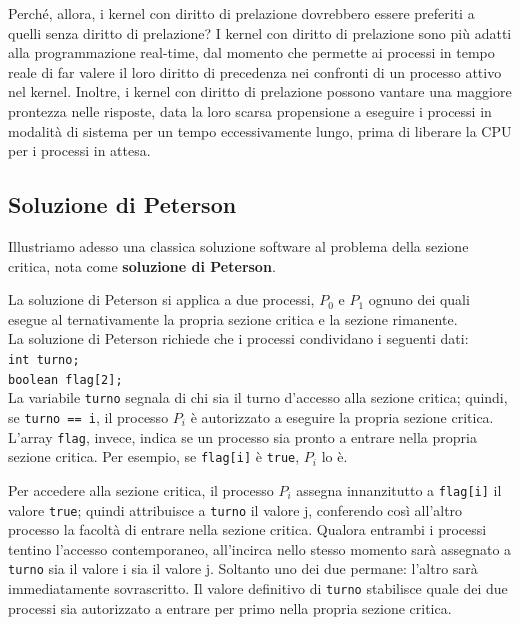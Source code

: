 \documentclass[11pt,a4paper]{article}
\begin{document}
Perché, allora, i kernel con diritto di prelazione dovrebbero essere preferiti a quelli sen­za diritto di prelazione? I kernel con diritto di prelazione sono più adatti alla programma­zione real-time, dal momento che permette ai processi in tempo reale di far valere il loro di­ritto di precedenza nei confronti di un processo attivo nel kernel. Inoltre, i kernel con diritto di prelazione possono vantare una maggiore prontezza nelle risposte, data la loro scarsa
propensione a eseguire i processi in modalità di sistema per un tempo eccessivamente lungo,
prima di liberare la CPU per i processi in attesa.

\subsection{Soluzione di Peterson}
Illustriamo adesso una classica soluzione software al problema della sezione critica, nota co­me \textbf{soluzione di Peterson}.

La soluzione di Peterson si applica a due processi, $P_0$ e $P_1$ ognuno dei quali esegue al
ternativamente la propria sezione critica e la sezione rimanente.\\
La soluzione di Peterson richiede che i processi condividano i seguenti dati:\\
\texttt{int turno;}\\
\texttt{boolean flag[2];}\medskip\\
La variabile \texttt{turno} segnala di chi sia il turno d'accesso alla sezione critica;
quindi, se \texttt{turno == i}, il processo $P_i$ è autorizzato a eseguire la propria sezione critica.
L'array \texttt{flag}, invece, indica se un processo sia pronto a entrare nella propria sezione critica.
Per esempio, se \texttt{flag[i]} è \texttt{true}, $P_i$ lo è.

Per accedere alla sezione critica, il processo $P_i$ assegna innanzitutto a \texttt{flag[i]} il valore \texttt{true}; quindi attribuisce a \texttt{turno} il valore j, conferendo così all'altro processo la facoltà
di entrare nella sezione critica. Qualora entrambi i processi tentino l'accesso contemporaneo, all'incirca nello stesso momento sarà assegnato a \texttt{turno} sia il valore i sia il valore j.
Soltanto uno dei due permane: l'altro sarà immediatamente sovrascritto. Il valore definitivo di \texttt{turno} stabilisce quale dei due processi sia autorizzato a entrare per primo nella propria
sezione critica.
\end{document}
